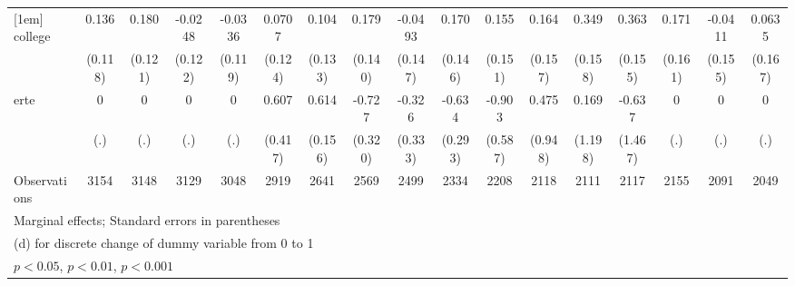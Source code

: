{\begin{tabular}{l*{16}{c}}
[1em]
college             &       0.136         &       0.180         &     -0.0248         &     -0.0336         &      0.0707         &       0.104         &       0.179         &     -0.0493         &       0.170         &       0.155         &       0.164         &       0.349\sym{*}  &       0.363\sym{*}  &       0.171         &     -0.0411         &      0.0635         \\
                    &     (0.118)         &     (0.121)         &     (0.122)         &     (0.119)         &     (0.124)         &     (0.133)         &     (0.140)         &     (0.147)         &     (0.146)         &     (0.151)         &     (0.157)         &     (0.158)         &     (0.155)         &     (0.161)         &     (0.155)         &     (0.167)         \\
[1em]
erte                &           0         &           0         &           0         &           0         &       0.607         &       0.614\sym{***}&      -0.727\sym{*}  &      -0.326         &      -0.634\sym{*}  &      -0.903         &       0.475         &       0.169         &      -0.637         &           0         &           0         &           0         \\
                    &         (.)         &         (.)         &         (.)         &         (.)         &     (0.417)         &     (0.156)         &     (0.320)         &     (0.333)         &     (0.293)         &     (0.587)         &     (0.948)         &     (1.198)         &     (1.467)         &         (.)         &         (.)         &         (.)         \\
\hline
Observations        &        3154         &        3148         &        3129         &        3048         &        2919         &        2641         &        2569         &        2499         &        2334         &        2208         &        2118         &        2111         &        2117         &        2155         &        2091         &        2049         \\
\hline\hline
\multicolumn{17}{l}{\footnotesize Marginal effects; Standard errors in parentheses}\\
\multicolumn{17}{l}{\footnotesize  (d) for discrete change of dummy variable from 0 to 1}\\
\multicolumn{17}{l}{\footnotesize \sym{*} \(p<0.05\), \sym{**} \(p<0.01\), \sym{***} \(p<0.001\)}\\
\end{tabular}
}
